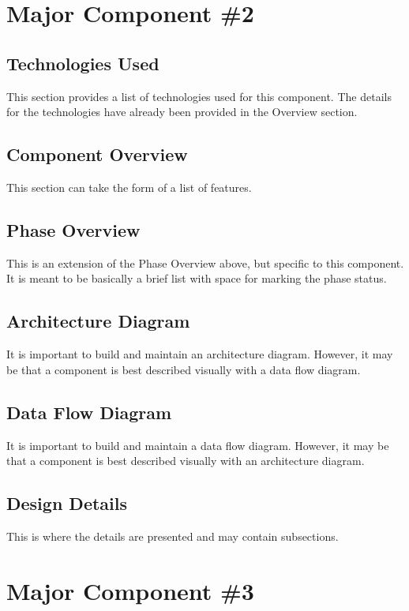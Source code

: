 \section{Major Component \#2 }

\subsection{Technologies  Used}
This section provides a list of technologies used for this component.  The details 
for the technologies have already been provided in the Overview section. 

\subsection{Component  Overview}
This section can take the form of a list of features. 

\subsection{Phase Overview}
This is an extension of the Phase Overview above, but specific to this component. 
 It is meant to be basically a brief list with space for marking the phase status. 

\subsection{ Architecture  Diagram}
It is important to build and maintain an architecture diagram.  However, it may 
be that a component is best described visually with a data flow diagram. 


\subsection{Data Flow Diagram}
It is important to build and maintain a data flow diagram.  However, it may be 
that a component is best described visually with an architecture diagram. 


\subsection{Design Details}
This is where the details are presented and may contain subsections. 


\section{Major Component \#3 }

